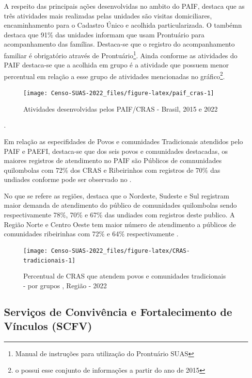 \documentclass[
  brazilian]{report}
\begin{document}
A respeito das principais ações desenvolvidas no ambito do PAIF, destaca
que as três atividades mais realizadas pelas unidades são visitas
domiciliares, encaminhamento para o Cadastro Único e acolhida
particularizada. O  tambémn destaca que 91\% das
unidades informam que usam Prontuário para acompanhamento das famílias.
Destaca-se que o registro do acompanhamento familiar é obrigatório
através de
Prontuário\footnote{Manual de instruções para utilização do Prontuário SUAS}.
Ainda conforme as atividades do PAIF destaca-se que a acolhida em grupo
é a atividade que possuem menor percentual em relação a esse grupo de
atividades mencionadas no
gráfico\footnote{o  possui esse conjunto de informações a partir do ano de 2015}.

\begin{figure}
\texttt{[image: Censo-SUAS-2022\_files/figure-latex/paif\_cras-1]} \caption[Atividades desenvolvidas pelos PAIF/CRAS - Brasil, 2015 e 2022]{Atividades desenvolvidas pelos PAIF/CRAS - Brasil, 2015 e 2022}\label{fig:paif_cras}
\end{figure}

.

Em relação as especifidades de Povos e comunidades Tradicionais
atendidos pelo PAIF e PAEFI, destaca-se que dos seis povos e comunidades
destacadas, os maiores registros de atendimento no PAIF são Públicos de
comnunidades quilombolas com 72\% dos CRAS e Ribeirinhos com registros
de 70\% das undiades conforme pode ser observado no
.

No que se refere as regiões, destaca que o Nordeste, Sudeste e Sul
registram maior demanda de atendimento do público de comunidades
quilombolas sendo respectivamente 78\%, 70\% e 67\% das undiades com
registros deste publico. A Região Norte e Centro Oeste tem maior número
de atendimento a públicos de comunidades ribeirinhas com 72\% e 64\%
respectivamente .

\begin{figure}
\texttt{[image: Censo-SUAS-2022\_files/figure-latex/CRAS-tradicionais-1]} \caption[Percentual de CRAS que atendem povos e comunidades tradicionais -  por grupos , Região - 2022]{Percentual de CRAS que atendem povos e comunidades tradicionais -  por grupos , Região - 2022}\label{fig:CRAS-tradicionais}
\end{figure}

\hypertarget{serviuxe7os-de-convivuxeancia-e-fortalecimento-de-vuxednculos-scfv}{%
\subsection{Serviços de Convivência e Fortalecimento de Vínculos
(SCFV)}\label{serviuxe7os-de-convivuxeancia-e-fortalecimento-de-vuxednculos-scfv}}
\end{document}

